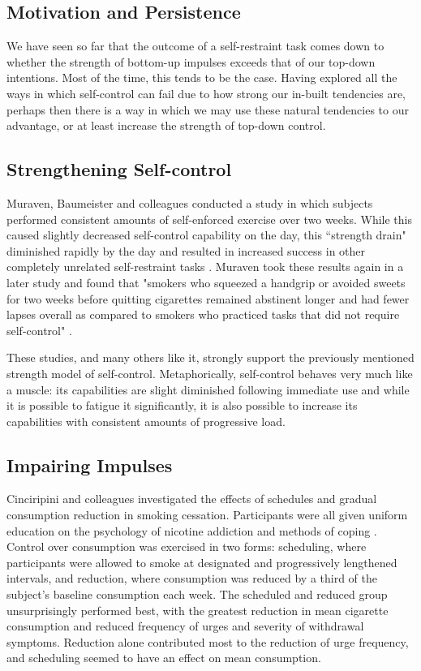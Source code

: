 \subsection{Motivation and Persistence}
We have seen so far that the outcome of a self-restraint task comes down to whether the strength of bottom-up impulses exceeds that of our top-down intentions. Most of the time, this tends to be the case. Having explored all the ways in which self-control can fail due to how strong our in-built tendencies are, perhaps then there is a way in which we may use these natural tendencies to our advantage, or at least increase the strength of top-down control.

\subsection{Strengthening Self-control}
Muraven, Baumeister and colleagues conducted a study in which subjects performed consistent amounts of self-enforced exercise over two weeks. While this caused slightly decreased self-control capability on the day, this ``strength drain" diminished rapidly by the day and resulted in increased success in other completely unrelated self-restraint tasks \cite{muraven1999longitudinal}. Muraven took these results again in a later study and found that "smokers who squeezed a handgrip or avoided sweets for two weeks before quitting cigarettes remained abstinent longer and had fewer lapses overall as compared to smokers who practiced tasks that did not require self-control" \cite{muraven2010practicing}. 

These studies, and many others like it, strongly support the previously mentioned strength model of self-control. Metaphorically, self-control behaves very much like a muscle: its capabilities are slight diminished following immediate use and while it is possible to fatigue it significantly, it is also possible to increase its capabilities with consistent amounts of progressive load.

\subsection{Impairing Impulses}
Cinciripini and colleagues investigated the effects of schedules and gradual consumption reduction in smoking cessation. Participants were all given uniform education on the psychology of nicotine addiction and methods of coping \cite{cinciripini1995effects}. Control over consumption was exercised in two forms: scheduling, where participants were allowed to smoke at designated and progressively lengthened intervals, and reduction, where consumption was reduced by a third of the subject's baseline consumption each week. The scheduled and reduced group unsurprisingly performed best, with the greatest reduction in mean cigarette consumption and reduced frequency of urges and severity of withdrawal symptoms. Reduction alone contributed most to the reduction of urge frequency, and scheduling seemed to have an effect on mean consumption. 

